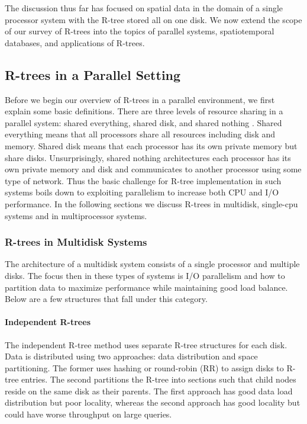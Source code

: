 The discussion thus far has focused on spatial data in the domain of a single
processor system with the R-tree stored all on one disk. We now extend the 
scope of our survey of R-trees into the topics of parallel systems, 
spatiotemporal databases, and applications of R-trees.

\subsection{R-trees in a Parallel Setting}
Before we begin our overview of R-trees in a parallel environment, we first 
explain some basic definitions. There are three levels of resource sharing in
a parallel system: shared everything, shared disk, and shared nothing
\cite{thebook}. Shared everything means that all processors share all 
resources including disk and memory. Shared disk means that each processor 
has its own private memory but share disks. Unsurprisingly, shared nothing 
architectures each processor has its own private memory and disk and 
communicates to another processor using some type of network. 
Thus the basic challenge for R-tree 
implementation in such systems boils down to exploiting parallelism to 
increase both CPU and I/O performance. In the following sections we discuss
R-trees in multidisk, single-cpu systems and in multiprocessor systems.

\subsubsection{R-trees in Multidisk Systems}
The architecture of a multidisk system consists of a single processor and 
multiple disks. The focus then in these types of systems is I/O parallelism
and how to partition data to maximize performance while maintaining good load
balance. Below are a few structures that fall under this category.

\paragraph{Independent R-trees}
The independent R-tree method \cite{kamel1992parallel, thebook} uses separate 
R-tree structures for each disk.
Data is distributed using two approaches: data distribution and space 
partitioning. The former uses hashing or round-robin (RR) to assign disks to
R-tree entries. The second partitions the R-tree into sections such that 
child nodes reside on the same disk as their parents. The first approach 
has good data load distribution but poor locality, whereas the second approach
has good locality but could have worse throughput on large queries.

